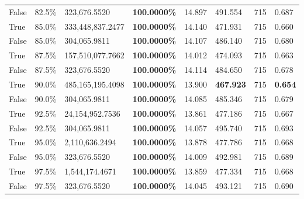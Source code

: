 \begin{table}[H]
\begin{tabular}{lllrllll}
\cline{1-8}
False & 82.5\% & 323,676.5520 & \bfseries \color{red} 100.0000\% & 14.897 & 491.554 & 715 & 0.687 \\
\cline{1-8}
True & 85.0\% & 333,448,837.2477 & \bfseries \color{red} 100.0000\% & 14.140 & 471.931 & 715 & 0.660 \\
\cline{1-8}
False & 85.0\% & 304,065.9811 & \bfseries \color{red} 100.0000\% & 14.107 & 486.140 & 715 & 0.680 \\
\cline{1-8}
True & 87.5\% & 157,510,077.7662 & \bfseries \color{red} 100.0000\% & 14.012 & 474.093 & 715 & 0.663 \\
\cline{1-8}
False & 87.5\% & 323,676.5520 & \bfseries \color{red} 100.0000\% & 14.114 & 484.650 & 715 & 0.678 \\
\cline{1-8}
True & 90.0\% & 485,165,195.4098 & \bfseries \color{red} 100.0000\% & 13.900 & \bfseries \color{red} 467.923 & 715 & \bfseries \color{red} 0.654 \\
\cline{1-8}
False & 90.0\% & 304,065.9811 & \bfseries \color{red} 100.0000\% & 14.085 & 485.346 & 715 & 0.679 \\
\cline{1-8}
True & 92.5\% & 24,154,952.7536 & \bfseries \color{red} 100.0000\% & 13.861 & 477.186 & 715 & 0.667 \\
\cline{1-8}
False & 92.5\% & 304,065.9811 & \bfseries \color{red} 100.0000\% & 14.057 & 495.740 & 715 & 0.693 \\
\cline{1-8}
True & 95.0\% & 2,110,636.2494 & \bfseries \color{red} 100.0000\% & 13.878 & 477.786 & 715 & 0.668 \\
\cline{1-8}
False & 95.0\% & 323,676.5520 & \bfseries \color{red} 100.0000\% & 14.009 & 492.981 & 715 & 0.689 \\
\cline{1-8}
True & 97.5\% & 1,544,174.4671 & \bfseries \color{red} 100.0000\% & 13.859 & 477.334 & 715 & 0.668 \\
\cline{1-8}
False & 97.5\% & 323,676.5520 & \bfseries \color{red} 100.0000\% & 14.045 & 493.121 & 715 & 0.690 \\
\cline{1-8}
\bottomrule
\end{tabular}
\end{table}
